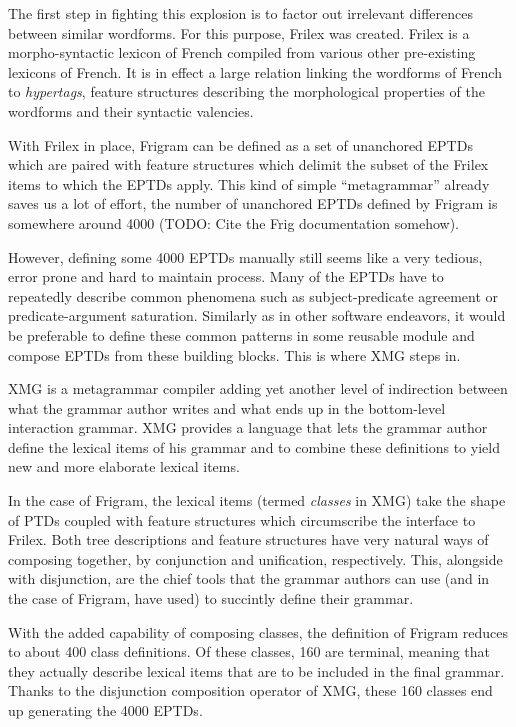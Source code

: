 The first step in fighting this explosion is to factor out irrelevant
differences between similar wordforms. For this purpose, Frilex was
created. Frilex is a morpho-syntactic lexicon of French compiled from
various other pre-existing lexicons of French. It is in effect a large
relation linking the wordforms of French to \emph{hypertags}, feature
structures describing the morphological properties of the wordforms and
their syntactic valencies.

With Frilex in place, Frigram can be defined as a set of unanchored
EPTDs which are paired with feature structures which delimit the subset
of the Frilex items to which the EPTDs apply. This kind of simple
``metagrammar'' already saves us a lot of effort, the number of
unanchored EPTDs defined by Frigram is somewhere around 4000 (TODO: Cite
the Frig documentation somehow).

However, defining some 4000 EPTDs manually still seems like a very
tedious, error prone and hard to maintain process. Many of the EPTDs
have to repeatedly describe common phenomena such as subject-predicate
agreement or predicate-argument saturation. Similarly as in other
software endeavors, it would be preferable to define these common
patterns in some reusable module and compose EPTDs from these building
blocks. This is where XMG steps in.

XMG is a metagrammar compiler adding yet another level of indirection
between what the grammar author writes and what ends up in the
bottom-level interaction grammar. XMG provides a language that lets the
grammar author define the lexical items of his grammar and to combine
these definitions to yield new and more elaborate lexical items.

In the case of Frigram, the lexical items (termed \emph{classes} in XMG)
take the shape of PTDs coupled with feature structures which
circumscribe the interface to Frilex. Both tree descriptions and feature
structures have very natural ways of composing together, by conjunction
and unification, respectively. This, alongside with disjunction, are the
chief tools that the grammar authors can use (and in the case of
Frigram, have used) to succintly define their grammar.

With the added capability of composing classes, the definition of
Frigram reduces to about 400 class definitions. Of these classes, 160
are terminal, meaning that they actually describe lexical items that are
to be included in the final grammar. Thanks to the disjunction
composition operator of XMG, these 160 classes end up generating the
4000 EPTDs.


